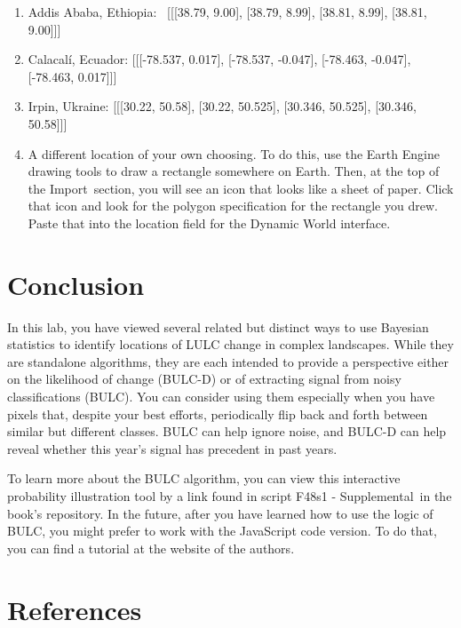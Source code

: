 \documentclass[
  letterpaper,
  DIV=11,
  numbers=noendperiod]{scrreprt}
\begin{document}
\begin{enumerate}
\def\labelenumi{\arabic{enumi}.}
\setcounter{enumi}{1}
\item
  Addis Ababa, Ethiopia: ~{[}{[}{[}38.79, 9.00{]}, {[}38.79, 8.99{]},
  {[}38.81, 8.99{]}, {[}38.81, 9.00{]}{]}{]}
\item
  Calacalí, Ecuador: {[}{[}{[}-78.537, 0.017{]}, {[}-78.537, -0.047{]},
  {[}-78.463, -0.047{]}, {[}-78.463, 0.017{]}{]}{]}
\item
  Irpin, Ukraine: {[}{[}{[}30.22, 50.58{]}, {[}30.22, 50.525{]},
  {[}30.346, 50.525{]}, {[}30.346, 50.58{]}{]}{]}
\item
  A different location of your own choosing. To do this, use the Earth
  Engine drawing tools to draw a rectangle somewhere on Earth. Then, at
  the top of the Import~section, you will see an icon that looks like a
  sheet of paper. Click that icon and look for the polygon specification
  for the rectangle you drew. Paste that into the location field for the
  Dynamic World interface.
\end{enumerate}

\hypertarget{conclusion-15}{%
\section*{Conclusion}\label{conclusion-15}}


In this lab, you have viewed several related but distinct ways to use
Bayesian statistics to identify locations of LULC change in complex
landscapes. While they are standalone algorithms, they are each intended
to provide a perspective either on the likelihood of change (BULC-D) or
of extracting signal from noisy classifications (BULC). You can consider
using them especially when you have pixels that, despite your best
efforts, periodically flip back and forth between similar but different
classes. BULC can help ignore noise, and BULC-D can help reveal whether
this year's signal has precedent in past years.

To learn more about the BULC algorithm, you can view this interactive
probability illustration tool by a link found in script F48s1 -
Supplemental~in the book's repository. In the future, after you have
learned how to use the logic of BULC, you might prefer to work with the
JavaScript code version. To do that, you can find a tutorial at the
website of the authors.

\hypertarget{references-11}{%
\section*{References}\label{references-11}}
\end{document}
